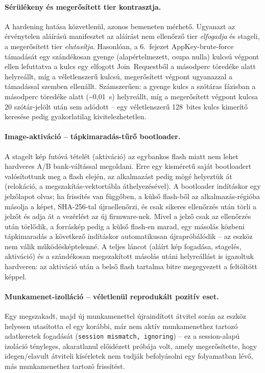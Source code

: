\documentclass[12pt,a4paper]{article}
\begin{document}
\paragraph{Sérülékeny és megerősített tier kontrasztja.} A hardening hatása
közvetlenül, azonos bemeneten mérhető. Ugyanazt az érvénytelen aláírású
manifesztet az aláírást nem ellenőrző tier \emph{elfogadja} és stageli, a
megerősített tier \emph{elutasítja}. Hasonlóan, a 6.\ fejezet
AppKey-brute-force támadását egy szándékosan gyenge (alapértelmezett, csupa
nulla) kulcsú végpont ellen lefuttatva a kulcs egy elfogott Join~Requestből a
másodperc töredéke alatt helyreállt, míg a véletlenszerű kulcsú, megerősített
végpont ugyanazzal a támadással szemben ellenállt. Számszerűen: a gyenge
kulcs a szótáras fázisban a másodperc töredéke alatt (\textasciitilde0{,}01~s)
helyreállt, míg a megerősített végpont kulcsa 20 szótár-jelölt után sem adódott --
egy véletlenszerű 128~bites kulcs kimerítő keresése pedig gyakorlatilag
kivitelezhetetlen.

\paragraph{Image-aktiváció -- tápkimaradás-tűrő bootloader.} A stagelt kép
futóvá tételét (aktiváció) az egybankos flash miatt nem lehet hardveres A/B
bank-váltással megoldani. Erre egy kisméretű saját bootloadert valósítottunk
meg a flash elején, az alkalmazást pedig mögé helyeztük át (relokáció, a
megszakítás-vektortábla áthelyezésével). A bootloader indításkor egy jelzőlapot
olvas; ha frissítés van függőben, a külső flash-ből az alkalmazás-régióba
másolja a képet, SHA-256-tal újraellenőrzi, és csak sikeres ellenőrzés után
törli a jelzőt és adja át a vezérlést az új firmware-nek. Mivel a jelző csak az
ellenőrzés után törlődik, a forráskép pedig a külső flash-en marad, egy másolás
közbeni tápkimaradás a következő indításkor automatikusan újrapróbálódik -- az
eszköz nem válik működésképtelenné. A teljes láncot (aláírt kép fogadása,
stagelés, aktiváció) és a szándékosan megszakított másolás utáni helyreállást is
igazoltuk hardveren: az aktiváció után a belső flash tartalma bitre megegyezett
a feltöltött képpel.

\paragraph{Munkamenet-izolláció -- véletlenül reprodukált pozitív eset.} Egy
megszakadt, majd új munkamenettel újraindított átvitel során az eszköz
helyesen utasította el egy korábbi, már nem aktív munkamenethez tartozó
adatkeretek fogadását (\texttt{session mismatch, ignoring}) -- ez a
session-alapú izoláció tényleges, akaratlanul előidézett próbája volt,
amely megerősítette, hogy idegen/elavult átviteli kísérletek nem tudják
befolyásolni egy folyamatban lévő, más munkamenethez tartozó frissítést.
\end{document}
